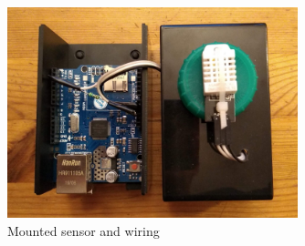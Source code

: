 \documentclass[a4paper, 11pt]{article}
\begin{document}
\begin{figure}[H]
  \centering
  \includegraphics[width=0.75\textwidth]{packaging.jpg}
  \caption{Mounted sensor and wiring}
\end{figure}
\end{document}
